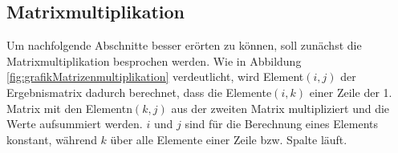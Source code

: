 \subsection{Matrixmultiplikation}\label{sec:Matrixmultiplikation}

% 
% 
% 
 
 


Um nachfolgende Abschnitte besser erörten zu können, soll zunächst die Matrixmultiplikation besprochen werden.
Wie in Abbildung \ref{fig:grafikMatrizenmultiplikation} verdeutlicht, wird Element$(i,j)$ der Ergebnismatrix dadurch berechnet, dass die Elemente$(i,k)$ einer Zeile der 1. Matrix
mit den Elementn$(k,j)$ aus der zweiten Matrix multipliziert und die Werte aufsummiert werden. $i$ und $j$ sind für die Berechnung eines Elements konstant, während $k$ über alle
Elemente einer Zeile bzw. Spalte läuft.

